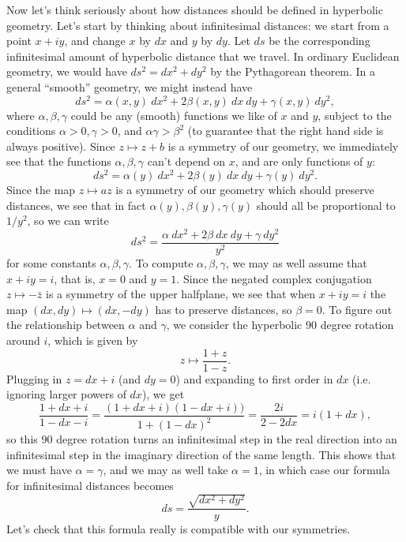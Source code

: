 Now let's think seriously about how distances should be defined in hyperbolic geometry. Let's start by thinking about infinitesimal distances: we start from a point $x + iy$, and change $x$ by $dx$ and $y$ by $dy$. Let $ds$ be the corresponding infinitesimal amount of hyperbolic distance that we travel. In ordinary Euclidean geometry, we would have $ds^2 = dx^2 + dy^2$ by the Pythagorean theorem. In a general ``smooth'' geometry, we might instead have
\[
ds^2 = \alpha(x,y)\ dx^2 + 2\beta(x,y)\ dx\ dy + \gamma(x,y)\ dy^2,
\]
where $\alpha, \beta, \gamma$ could be any (smooth) functions we like of $x$ and $y$, subject to the conditions $\alpha > 0, \gamma > 0$, and $\alpha\gamma > \beta^2$ (to guarantee that the right hand side is always positive). Since $z \mapsto z+b$ is a symmetry of our geometry, we immediately see that the functions $\alpha, \beta, \gamma$ can't depend on $x$, and are only functions of $y$:
\[
ds^2 = \alpha(y)\ dx^2 + 2\beta(y)\ dx\ dy + \gamma(y)\ dy^2.
\]
Since the map $z\mapsto az$ is a symmetry of our geometry which should preserve distances, we see that in fact $\alpha(y), \beta(y), \gamma(y)$ should all be proportional to $1/y^2$, so we can write
\[
ds^2 = \frac{\alpha\ dx^2 + 2\beta\ dx\ dy + \gamma\ dy^2}{y^2}
\]
for some constants $\alpha, \beta, \gamma$. To compute $\alpha, \beta, \gamma$, we may as well assume that $x + iy = i$, that is, $x = 0$ and $y = 1$. Since the negated complex conjugation $z \mapsto -\bar{z}$ is a symmetry of the upper halfplane, we see that when $x+iy = i$ the map $(dx,dy) \mapsto (dx,-dy)$ has to preserve distances, so $\beta = 0$. To figure out the relationship between $\alpha$ and $\gamma$, we consider the hyperbolic $90$ degree rotation around $i$, which is given by
\[
z \mapsto \frac{1+z}{1-z}.
\]
Plugging in $z = dx + i$ (and $dy = 0$) and expanding to first order in $dx$ (i.e. ignoring larger powers of $dx$), we get
\[
\frac{1 + dx + i}{1-dx - i} = \frac{(1+dx+i)(1-dx+i))}{1 + (1-dx)^2} = \frac{2i}{2-2dx} = i(1 + dx),
\]
so this $90$ degree rotation turns an infinitesimal step in the real direction into an infinitesimal step in the imaginary direction of the same length. This shows that we must have $\alpha = \gamma$, and we may as well take $\alpha = 1$, in which case our formula for infinitesimal distances becomes
\[
ds = \frac{\sqrt{dx^2 + dy^2}}{y}.
\]
Let's check that this formula really is compatible with our symmetries.

